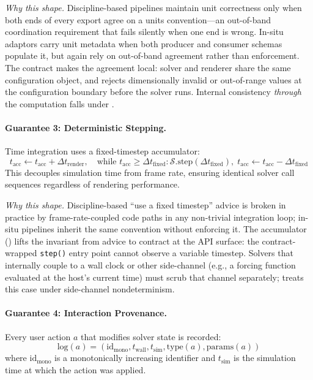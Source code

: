 \documentclass[journal]{IEEEtran}
\begin{document}
\emph{Why this shape.} Discipline-based pipelines maintain unit
correctness only when both ends of every export agree on a units
convention---an out-of-band coordination requirement that fails
silently when one end is wrong. In-situ adaptors carry unit metadata
when both producer and consumer schemas populate it, but again rely on
out-of-band agreement rather than enforcement. The contract makes the
agreement local: solver and renderer share the same configuration
object, and  rejects dimensionally invalid or
out-of-range values at the configuration boundary before the solver
runs. Internal consistency \emph{through} the computation falls under
.

\paragraph{Guarantee 3: Deterministic Stepping.}
Time integration uses a fixed-timestep accumulator:
\begin{equation}
  t_{\text{acc}} \leftarrow t_{\text{acc}} + \Delta t_{\text{render}}, \quad
  \text{while } t_{\text{acc}} \geq \Delta t_{\text{fixed}}:
    \mathcal{S}.\text{step}(\Delta t_{\text{fixed}}), \;
    t_{\text{acc}} \leftarrow t_{\text{acc}} - \Delta t_{\text{fixed}}
  \label{eq:deterministic}
\end{equation}
This decouples simulation time from frame rate, ensuring identical
solver call sequences regardless of rendering performance.

\emph{Why this shape.} Discipline-based ``use a fixed timestep''
advice is broken in practice by frame-rate-coupled code paths in any
non-trivial integration loop; in-situ pipelines inherit the same
convention without enforcing it. The accumulator
() lifts the invariant from advice to
contract at the API surface: the contract-wrapped \texttt{step()} entry
point cannot observe a variable timestep. Solvers that internally
couple to a wall clock or other side-channel (e.g., a forcing function
evaluated at the host's current time) must scrub that channel
separately;  treats this case under
side-channel nondeterminism.

\paragraph{Guarantee 4: Interaction Provenance.}
Every user action $a$ that modifies solver state is recorded:
\begin{equation}
  \text{log}(a) = (\text{id}_{\text{mono}}, t_{\text{wall}},
    t_{\text{sim}}, \text{type}(a), \text{params}(a))
  \label{eq:interaction}
\end{equation}
where $\text{id}_{\text{mono}}$ is a monotonically increasing identifier and
$t_{\text{sim}}$ is the simulation time at which the action was applied.
\end{document}
